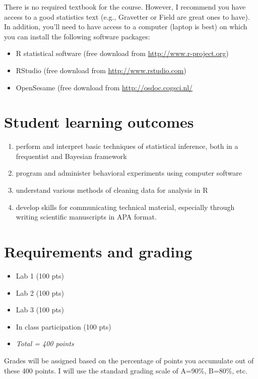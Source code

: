 \documentclass[10pt]{article}
\begin{document}
There is no required textbook for the course. However, I recommend you have access to a good statistics text (e.g., Gravetter or Field are great ones to have).  In addition, you'll need to have access to a computer (laptop is best) on which you can install the following software packages:

\begin{itemize}
\item R statistical software (free download from \href{http://www.r-project.org}{\url{http://www.r-project.org}})
\item RStudio (free download from \href{http://www.rstudio.com}{\url{http://www.rstudio.com}})
\item OpenSesame (free download from \url{http://osdoc.cogsci.nl/}
\end{itemize}

\section*{Student learning outcomes}
\label{sec-4}

\begin{enumerate}
\item perform and interpret basic techniques of statistical inference, both in a frequentist and Bayesian framework
\item program and administer behavioral experiments using computer software
\item understand various methods of cleaning data for analysis in R
\item develop skills for communicating technical material, especially through writing scientific manuscripts in APA format.
\end{enumerate}

\section*{Requirements and grading}
\label{sec-5}

\begin{itemize}
\item Lab 1 (100 pts)
\item Lab 2 (100 pts)
\item Lab 3 (100 pts)
\item In class participation (100 pts)
\item \emph{Total = 400 points}
\end{itemize}

Grades will be assigned based on the percentage of points you accumulate out of these 400 points.  I will use the standard grading scale of A=90\%, B=80\%, etc.
\end{document}

